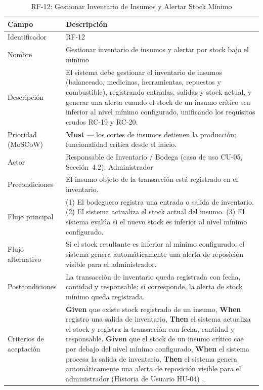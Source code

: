 \documentclass[12pt,a4paper]{article}
\begin{document}
\begin{table}[H]
\centering
\caption{RF-12: Gestionar Inventario de Insumos y Alertar Stock Mínimo}
\begin{tabular}{|p{3.6cm}|p{10.4cm}|}
\hline
\textbf{Campo} & \textbf{Descripción} \\
\hline
Identificador & RF-12 \\ \hline
Nombre & Gestionar inventario de insumos y alertar por stock bajo el mínimo \\ \hline
Descripción & El sistema debe gestionar el inventario de insumos (balanceado,
medicinas, herramientas, repuestos y combustible), registrando entradas,
salidas y stock actual, y generar una alerta cuando el stock de un insumo
crítico sea inferior al nivel mínimo configurado, unificando los requisitos
crudos RC-19 y RC-20. \\ \hline
Prioridad (MoSCoW) & \textbf{Must} --- los cortes de insumos detienen la
producción; funcionalidad crítica desde el inicio. \\ \hline
Actor & Responsable de Inventario / Bodega (caso de uso CU-05, Sección~4.2);
Administrador \\ \hline
Precondiciones & El insumo objeto de la transacción está registrado en el
inventario. \\ \hline
Flujo principal &
(1) El bodeguero registra una entrada o salida de inventario.
(2) El sistema actualiza el stock actual del insumo.
(3) El sistema evalúa si el nuevo stock es inferior al nivel mínimo
configurado. \\ \hline
Flujo alternativo & Si el stock resultante es inferior al mínimo configurado,
el sistema genera automáticamente una alerta de reposición visible para el
administrador. \\ \hline
Postcondiciones & La transacción de inventario queda registrada con fecha,
cantidad y responsable; si corresponde, la alerta de stock mínimo queda
registrada. \\ \hline
Criterios de aceptación &
\textbf{Given} que existe stock registrado de un insumo,
\textbf{When} registro una salida de inventario,
\textbf{Then} el sistema actualiza el stock y registra la transacción con
fecha, cantidad y responsable.
\textbf{Given} que el stock de un insumo crítico cae por debajo del nivel
mínimo configurado,
\textbf{When} el sistema procesa la salida de inventario,
\textbf{Then} el sistema genera automáticamente una alerta de reposición
visible para el administrador (Historia de Usuario HU-04) \cite{Cohn2004}. \\ \hline
\end{tabular}
\end{table}
\end{document}
